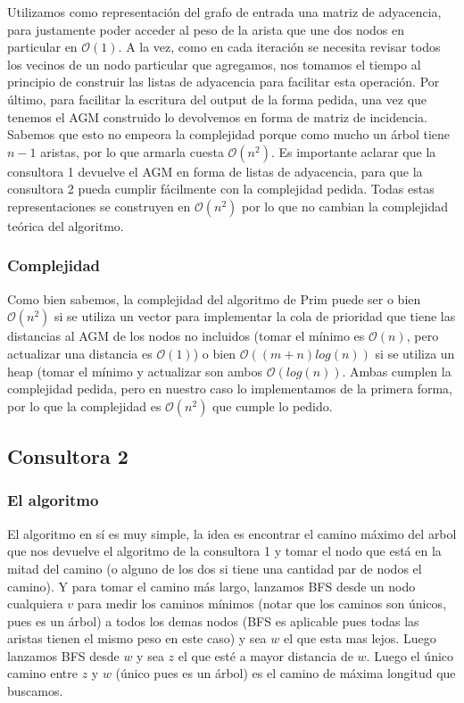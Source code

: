 \documentclass[A4paper,oneside,fleqn,11pt]{article}
\theoremstyle{definition}
\begin{document}
Utilizamos como representación del grafo de entrada una matriz de adyacencia, para justamente poder acceder al peso de la arista que une dos nodos en particular en $\mathcal{O} (1)$. A la vez, como en cada iteración se necesita revisar todos los vecinos de un nodo particular que agregamos, nos tomamos el tiempo al principio de construir las listas de adyacencia para facilitar esta operación. Por último, para facilitar la escritura del output de la forma pedida, una vez que tenemos el AGM construido lo devolvemos en forma de matriz de incidencia. Sabemos que esto no empeora la complejidad porque como mucho un árbol tiene $n-1$ aristas, por lo que armarla cuesta $\mathcal{O}(n^2)$. Es importante aclarar que la consultora 1 devuelve el AGM en forma de listas de adyacencia, para que la consultora 2 pueda cumplir fácilmente con la complejidad pedida. Todas estas representaciones se construyen en $\mathcal{O}(n^2)$ por lo que no cambian la complejidad teórica del algoritmo.


\subsubsection{Complejidad}

Como bien sabemos, la complejidad del algoritmo de Prim puede ser o bien $\mathcal{O} (n^2)$ si se utiliza un vector para implementar la cola de prioridad que tiene las distancias al AGM de los nodos no incluidos (tomar el mínimo es $\mathcal{O} (n)$, pero actualizar una distancia es $\mathcal{O} (1)$) o bien $\mathcal{O} ((m+n) log(n))$ si se utiliza un heap (tomar el mínimo y actualizar son ambos $\mathcal{O} (log(n))$. Ambas cumplen la complejidad pedida, pero en nuestro caso lo implementamos de la primera forma, por lo que la complejidad es $\mathcal{O} (n^2)$ que cumple lo pedido.

\subsection{Consultora 2}


\subsubsection{El algoritmo}
El algoritmo en sí es muy simple, la idea es encontrar el camino máximo del arbol que nos devuelve el algoritmo de la consultora 1 y tomar el nodo que está en la mitad del camino (o alguno de los dos si tiene una cantidad par de nodos el camino). Y para tomar el camino más largo, lanzamos BFS desde un nodo cualquiera $v$ para medir los caminos mínimos (notar que los caminos son únicos, pues es un árbol) a todos los demas nodos (BFS es aplicable pues todas las aristas tienen el mismo peso en este caso) y sea $w$ el que esta mas lejos. Luego lanzamos BFS desde $w$ y sea $z$ el que esté a mayor distancia de $w$. Luego el único camino entre $z$ y $w$ (único pues es un árbol) es el camino de máxima longitud que buscamos.
\end{document}
